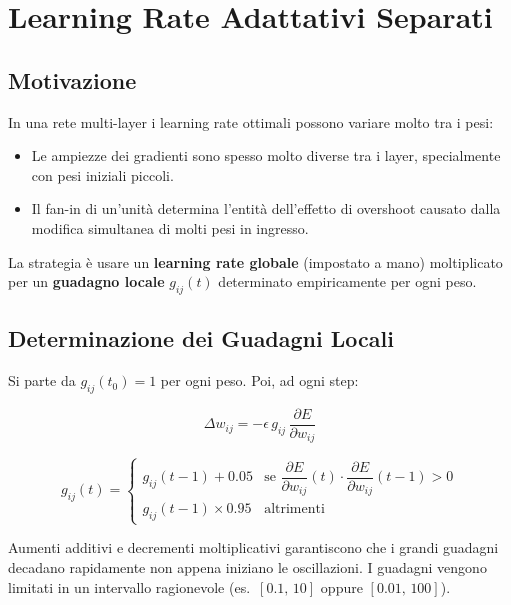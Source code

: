 \section{Learning Rate Adattativi Separati}
\label{sec:adaptive-lr}

\subsection{Motivazione}
\label{subsec:adaptive-lr-motivation}

In una rete multi-layer i learning rate ottimali possono variare molto tra i
pesi:

\begin{itemize}
  \item Le ampiezze dei gradienti sono spesso molto diverse tra i layer,
        specialmente con pesi iniziali piccoli.
  \item Il fan-in di un'unità determina l'entità dell'effetto di overshoot
        causato dalla modifica simultanea di molti pesi in ingresso.
\end{itemize}

La strategia è usare un \textbf{learning rate globale} (impostato a mano)
moltiplicato per un \textbf{guadagno locale} $g_{ij}(t)$ determinato
empiricamente per ogni peso.

\subsection{Determinazione dei Guadagni Locali}
\label{subsec:local-gains}

Si parte da $g_{ij}(t_0) = 1$ per ogni peso. Poi, ad ogni step:

\begin{equation}
  \Delta w_{ij} = -\epsilon\, g_{ij}\, \frac{\partial E}{\partial w_{ij}}
\end{equation}

\begin{equation}
  g_{ij}(t) =
  \begin{cases}
    g_{ij}(t-1) + 0.05
      & \text{se } \dfrac{\partial E}{\partial w_{ij}}(t)\cdot
                   \dfrac{\partial E}{\partial w_{ij}}(t-1) > 0 \\[8pt]
    g_{ij}(t-1) \times 0.95
      & \text{altrimenti}
  \end{cases}
\end{equation}

Aumenti additivi e decrementi moltiplicativi garantiscono che i grandi guadagni
decadano rapidamente non appena iniziano le oscillazioni. I guadagni vengono
limitati in un intervallo ragionevole (es.\ $[0.1,\, 10]$ oppure $[0.01,\, 100]$).

